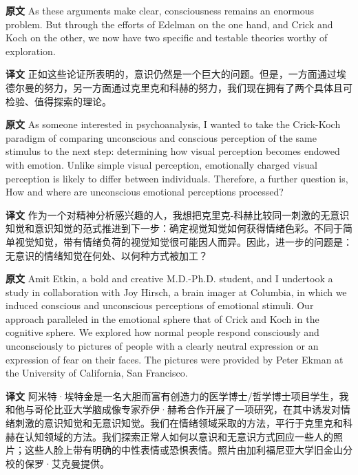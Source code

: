 \documentclass[UTF8]{ctexart}
\newenvironment{english}{\par\small\noindent\textbf{原文}\quad\ignorespaces}{\par}
\newenvironment{zhtranslation}{\par\noindent\textbf{译文}\quad\ignorespaces}{\par\vspace{0.35em}}
\begin{document}
\begin{english}
As these arguments make clear, consciousness remains an enormous problem. But through the efforts of Edelman on the one hand, and Crick and Koch on the other, we now have two specific and testable theories worthy of exploration.
\end{english}
\begin{zhtranslation}
正如这些论证所表明的，意识仍然是一个巨大的问题。但是，一方面通过埃德尔曼的努力，另一方面通过克里克和科赫的努力，我们现在拥有了两个具体且可检验、值得探索的理论。\end{zhtranslation}

\begin{english}
As someone interested in psychoanalysis, I wanted to take the Crick-Koch paradigm of comparing unconscious and conscious perception of the same stimulus to the next step: determining how visual perception becomes endowed with emotion. Unlike simple visual perception, emotionally charged visual perception is likely to differ between individuals. Therefore, a further question is, How and where are unconscious emotional perceptions processed?
\end{english}
\begin{zhtranslation}
作为一个对精神分析感兴趣的人，我想把克里克-科赫比较同一刺激的无意识知觉和意识知觉的范式推进到下一步：确定视觉知觉如何获得情绪色彩。不同于简单视觉知觉，带有情绪负荷的视觉知觉很可能因人而异。因此，进一步的问题是：无意识的情绪知觉在何处、以何种方式被加工？
\end{zhtranslation}

\begin{english}
Amit Etkin, a bold and creative M.D.-Ph.D. student, and I undertook a study in collaboration with Joy Hirsch, a brain imager at Columbia, in which we induced conscious and unconscious perceptions of emotional stimuli. Our approach paralleled in the emotional sphere that of Crick and Koch in the cognitive sphere. We explored how normal people respond consciously and unconsciously to pictures of people with a clearly neutral expression or an expression of fear on their faces. The pictures were provided by Peter Ekman at the University of California, San Francisco.
\end{english}
\begin{zhtranslation}
阿米特·埃特金是一名大胆而富有创造力的医学博士/哲学博士项目学生，我和他与哥伦比亚大学脑成像专家乔伊·赫希合作开展了一项研究，在其中诱发对情绪刺激的意识知觉和无意识知觉。我们在情绪领域采取的方法，平行于克里克和科赫在认知领域的方法。我们探索正常人如何以意识和无意识方式回应一些人的照片；这些人脸上带有明确的中性表情或恐惧表情。照片由加利福尼亚大学旧金山分校的保罗·艾克曼提供。\end{zhtranslation}
\end{document}
